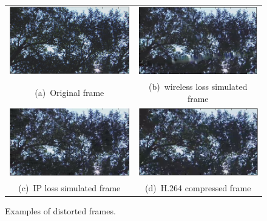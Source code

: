 \documentclass{article}
\begin{document}
\begin{figure}[h]
    \centering
    \begin{tabular}[h]{cc}
        \includegraphics[scale=.55]{orig} &
        \includegraphics[scale=.55]{wireless} \\
        (a)~Original frame&
        (b)~wireless loss simulated frame \\
       \includegraphics[scale=.55]{ip} &
       \includegraphics[scale=.55]{h264} \\
        (c)~IP loss simulated frame&
        (d)~H.264 compressed frame
    \end{tabular}
    \caption{Examples of distorted frames.}


\end{figure}
\end{document}
